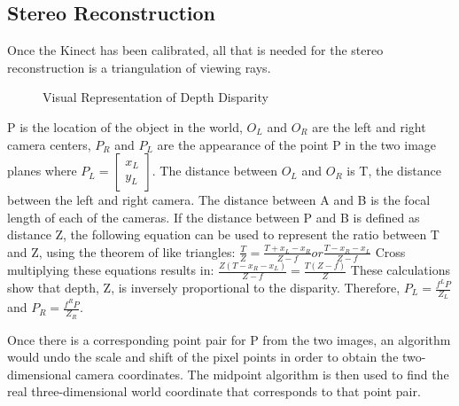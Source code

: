 \documentclass[pdftex,10.5pt]{report}
\begin{document}
\subsection{Stereo Reconstruction}
Once the Kinect has been calibrated, all that is needed for the stereo reconstruction is a triangulation of viewing rays.

\begin{figure}[H]
\centering
\caption{Visual Representation of Depth Disparity}
\end{figure}

P is the location of the object in the world, $O_{L}$ and $O_{R}$ are the left and right camera centers, $P_{R}$ and $P_{L}$ are the appearance of the point P in the two image planes where $P_{L}= 
\begin{bmatrix}
x_{L} \\
y_{L} 
\end{bmatrix} $. 
The distance between $O_{L}$ and $O_{R}$ is T, the distance between the left and right camera. The distance between A and B is the focal length of each of the cameras. If the distance between P and B is defined as distance Z, the following equation  can be used to represent the ratio between T and Z, using the theorem of like triangles: 
$\frac{T}{Z}=\frac{T+x_{L}-x_{R}}{Z-f} or \frac{T-{x_{R}-x_{L}}}{Z-f} $ 
Cross multiplying these equations results in: 
$\frac{Z(T-x_{R}-x_{L})}{Z-f} = \frac{T(Z-f)}{Z} $ 
These calculations show that depth, Z, is inversely proportional to the disparity. Therefore,  $P_{L}= \frac{f^{L}P}{Z_{L}} $ and $P_{R}= \frac{f^{R}P}{Z_{R}}. $ 

Once there is a corresponding point pair for P from the two images, an algorithm would undo the scale and shift of the pixel points in order to obtain the two-dimensional camera coordinates. The midpoint algorithm is then used to find the real three-dimensional world coordinate that corresponds to that point pair.
\end{document}
